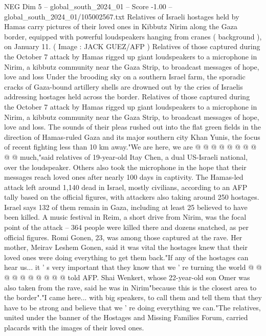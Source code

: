 \begin{textsample}{NEG Dim 5 – global\_south\_2024\_01 – Score -1.00 – global\_south\_2024\_01/105002567.txt}  \label{ex:f5_neg_432}
Relatives of Israeli hostages held by Hamas carry pictures of their loved ones in Kibbutz Nirim along the Gaza border, equipped with powerful loudspeakers hanging from cranes ( background ), on January 11. ( Image : JACK GUEZ/AFP ) Relatives of those captured during the October 7 attack by Hamas rigged up giant loudspeakers to a microphone in Nirim, a kibbutz community near the Gaza Strip, to broadcast messages of hope, love and loss Under the brooding sky on a southern Israel farm, the sporadic cracks of Gaza-bound artillery shells are drowned out by the cries of Israelis addressing hostages held across the border.
Relatives of those captured during the October 7 attack by Hamas rigged up giant loudspeakers to a microphone in Nirim, a kibbutz community near the Gaza Strip, to broadcast messages of hope, love and loss.
The sounds of their pleas rushed out into the flat green fields in the direction of Hamas-ruled Gaza and its major southern city Khan Yunis, the focus of recent fighting less than 10 km away."We are here, we are @ @ @ @ @ @ @ @ @ @ much,"said relatives of 19-year-old Itay Chen, a dual US-Israeli national, over the loudspeaker.
Others also took the microphone in the hope that their messages reach loved ones after nearly 100 days in captivity.
The Hamas-led attack left around 1,140 dead in Israel, mostly civilians, according to an AFP tally based on the official figures, with attackers also taking around 250 hostages.
Israel says 132 of them remain in Gaza, including at least 25 believed to have been killed.
A music festival in Reim, a short drive from Nirim, was the focal point of the attack -- 364 people were killed there and dozens snatched, as per official figures.
Romi Gonen, 23, was among those captured at the rave.
Her mother, Meirav Leshem Gonen, said it was vital the hostages knew that their loved ones were doing everything to get them back."If any of the hostages can hear us... it ' s very important that they know that we ' re turning the world @ @ @ @ @ @ @ @ @ @ told AFP.
Shai Wenkert, whose 22-year-old son Omer was also taken from the rave, said he was in Nirim"because this is the closest area to the border"."I came here... with big speakers, to call them and tell them that they have to be strong and believe that we ' re doing everything we can."The relatives, united under the banner of the Hostages and Missing Families Forum, carried placards with the images of their loved ones.

\end{textsample}
